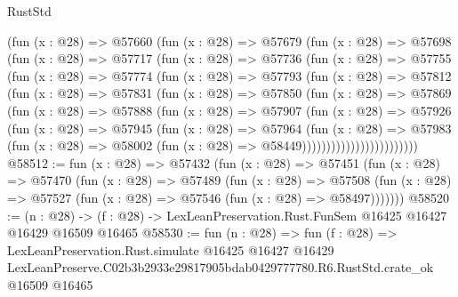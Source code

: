 \begin{lexlean}{RustStd}
\begin{coremodule}
            (fun (x : @28) =>
            @57660
              (fun (x : @28) =>
              @57679
                (fun (x : @28) =>
                @57698
                  (fun (x : @28) =>
                  @57717
                    (fun (x : @28) =>
                    @57736
                      (fun (x : @28) =>
                      @57755
                        (fun (x : @28) =>
                        @57774
                          (fun (x : @28) =>
                          @57793
                            (fun (x : @28) =>
                            @57812
                              (fun (x : @28) =>
                              @57831
                                (fun (x : @28) =>
                                @57850
                                  (fun (x : @28) =>
                                  @57869
                                    (fun (x : @28) =>
                                    @57888
                                      (fun (x : @28) =>
                                      @57907
                                        (fun (x : @28) =>
                                        @57926
                                          (fun (x : @28) =>
                                          @57945
                                            (fun (x : @28) =>
                                            @57964
                                              (fun (x : @28) =>
                                              @57983
                                                (fun (x : @28) =>
                                                @58002
                                                  (fun (x : @28) => @58449))))))))))))))))))))))))
@58512 := fun (x : @28) =>
  @57432
    (fun (x : @28) =>
    @57451
      (fun (x : @28) =>
      @57470
        (fun (x : @28) =>
        @57489
          (fun (x : @28) =>
          @57508 (fun (x : @28) => @57527 (fun (x : @28) => @57546 (fun (x : @28) => @58497)))))))
@58520 := (n : @28) ->
  (f : @28) -> LexLeanPreservation.Rust.FunSem @16425 @16427 @16429 @16509 @16465
@58530 := fun (n : @28) =>
  fun (f : @28) =>
  LexLeanPreservation.Rust.simulate
    @16425
    @16427
    @16429
    LexLeanPreserve.C02b3b2933e29817905bdab0429777780.R6.RustStd.crate_ok
    @16509
    @16465
\end{coremodule}
\end{lexlean}
